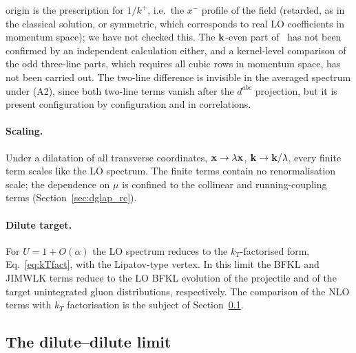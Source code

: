 origin is the prescription for $1/k^+$, i.e.\ the $x^-$ profile of the field (retarded, as in the classical solution, or symmetric, which corresponds to real LO coefficients in momentum space); we have not checked this. The $\mathbf{k}$-even part of~\cite{Li:2021ntm} has not been confirmed by an independent calculation either, and a kernel-level comparison of the odd three-line parts, which requires all cubic rows in momentum space, has not been carried out. The two-line difference is invisible in the averaged spectrum under (A2), since both two-line terms vanish after the $d^{abc}$ projection, but it is present configuration by configuration and in correlations.

\paragraph{Scaling.} Under a dilatation of all transverse coordinates, $\mathbf{x}\to\lambda\mathbf{x}$, $\mathbf{k}\to\mathbf{k}/\lambda$, every finite term scales like the LO spectrum. The finite terms contain no renormalisation scale; the dependence on $\mu$ is confined to the collinear and running-coupling terms (Section~\ref{sec:dglap_rc}).

\paragraph{Dilute target.} For $U=1+O(\alpha)$ the LO spectrum reduces to the $k_T$-factorised form, Eq.~\eqref{eq:kTfact}, with the Lipatov-type vertex. In this limit the BFKL and JIMWLK terms reduce to the LO BFKL evolution of the projectile and of the target unintegrated gluon distributions, respectively. The comparison of the NLO terms with $k_T$ factorisation is the subject of Section~\ref{sec:check_dilute}.

\subsection{The dilute--dilute limit}\label{sec:check_dilute}

